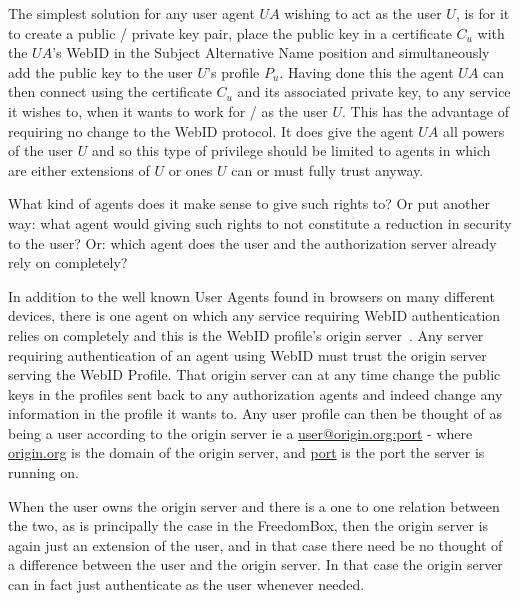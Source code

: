 \documentclass[a4paper]{llncs}
\begin{document}
The simplest solution for any user agent $UA$ wishing to act as the user $U$, is for it to create a public / private key pair,  place the public key in a certificate $C_u$ with the $UA$'s WebID in the Subject Alternative Name position and simultaneously add the public key to the user $U$'s profile $P_u$.
Having done this the agent $UA$ can then connect using the certificate $C_u$ and its associated private key, to any service it wishes to, when it wants to work for / as the user $U$.
This has the advantage of requiring no change to the WebID protocol.
It does give the agent $UA$ all powers of the user $U$ and so this type of privilege should be limited to agents in which are either extensions of $U$ or ones $U$ can or must fully trust anyway.



What kind of agents does it make sense to give such rights to?
Or put another way: what agent would giving such rights to not constitute a reduction in security to the user?
Or: which agent does the user and the authorization server already rely on completely?

In addition to the well known User Agents found in browsers on many different devices, there is one agent  on which any service requiring WebID authentication relies on completely and this is the WebID profile's origin server~\cite{barth-a-2011--a}.
Any server requiring authentication of an agent using WebID must trust the origin server serving the WebID Profile.
That origin server can at any time change the public keys in the profiles sent back to any authorization agents and indeed change any information in the profile it wants to.
Any user profile can then be thought of as being a user according to the origin server ie a \url{user@origin.org:port} - where \url{origin.org} is the domain of the origin server, and \url{port} is the port the server is running on.

When the user owns the origin server and there is a one to one relation between the two, as is principally the case in the FreedomBox, then the origin server is again just an extension of the user, and in that case there need be no thought of a difference between the user and the origin server.
In that case the origin server can in fact just authenticate as the user whenever needed. 
\end{document}
